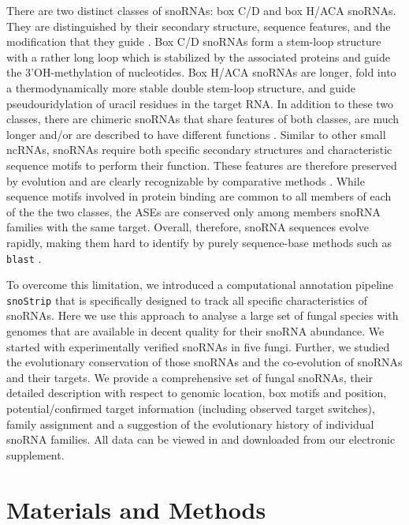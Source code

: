 \documentclass[preprint,3p,times,twocolumn]{elsarticle}
\newcommand{\snostrip}{\texttt{snoStrip}}
\begin{document}
There are two distinct classes of snoRNAs: box C/D and box H/ACA snoRNAs.
They are distinguished by their secondary structure, sequence features, and
the modification that they guide \cite{****}.  Box C/D snoRNAs form a
stem-loop structure with a rather long loop which is stabilized by the
associated proteins and guide the 3'OH-methylation of nucleotides.  Box
H/ACA snoRNAs are longer, fold into a thermodynamically more stable double
stem-loop structure, and guide pseudouridylation of uracil residues in the
target RNA.  In addition to these two classes, there are chimeric snoRNAs
that share features of both classes, are much longer and/or are described
to have different functions \cite{Darzacq:2002}. Similar to other small
ncRNAs, snoRNAs require both specific secondary structures and
characteristic sequence motifs to perform their function. These features
are therefore preserved by evolution and are clearly recognizable by
comparative methods \cite{****}. While sequence motifs involved in protein
binding are common to all members of each of the the two classes, the ASEs
are conserved only among members snoRNA families with the same
target. Overall, therefore, snoRNA sequences evolve rapidly, making them
hard to identify by purely sequence-base methods such as \texttt{blast}
\cite{Altschul:1990}.

To overcome this limitation, we introduced a computational annotation
pipeline \snostrip \cite{Bartschat:2014} that is specifically designed to
track all specific characteristics of snoRNAs. Here we use this approach to
analyse a large set of fungal species with genomes that are available in
decent quality for their snoRNA abundance.  We started with experimentally
verified snoRNAs in five fungi.  Further, we studied the evolutionary
conservation of those snoRNAs and the co-evolution of snoRNAs and their
targets. We provide a comprehensive set of fungal snoRNAs, their detailed
description with respect to genomic location, box motifs and position,
potential/confirmed target information (including observed target
switches), family assignment and a suggestion of the evolutionary history
of individual snoRNA families.  All data can be viewed in and downloaded
from our electronic supplement.


\section{Materials and Methods}
\end{document}

